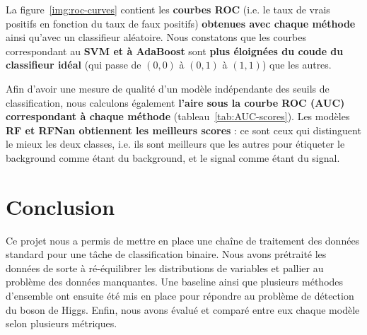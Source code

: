 \documentclass[12pt]{article}
\newcommand{\figref}[1]{figure~\ref{#1}}
\newcommand{\tabref}[1]{tableau~\ref{#1}}
\begin{document}
La \figref{img:roc-curves} contient les \textbf{courbes ROC} (i.e. le taux de
vrais positifs en fonction du taux de faux positifs) \textbf{obtenues avec
chaque méthode} ainsi qu'avec un classifieur aléatoire. Nous constatons que les
courbes correspondant au \textbf{SVM et à AdaBoost} sont \textbf{plus éloignées
du coude du classifieur idéal} (qui passe de $(0,0)$ à $(0,1)$ à $(1,1)$) que
les autres. 

Afin d'avoir une mesure de qualité d'un modèle indépendante des seuils de
classification, nous calculons également \textbf{l'aire sous la courbe ROC (AUC)
correspondant à chaque méthode} (\tabref{tab:AUC-scores}). Les modèles
\textbf{RF et RFNan obtiennent les meilleurs scores} : ce sont ceux qui
distinguent le mieux les deux classes, i.e. ils sont meilleurs que les autres
pour étiqueter le background comme étant du background, et le signal comme étant
du signal. \\

\begin{table}[H]
\centering
{}
\caption{AUC obtenus avec chaque méthode}
\label{tab:AUC-scores}
\end{table}

\section{Conclusion}

Ce projet nous a permis de mettre en place une chaîne de traitement des données
standard pour une tâche de classification binaire. Nous avons prétraité les
données de sorte à ré-équilibrer les distributions de variables et pallier au
problème des données manquantes. Une baseline ainsi que plusieurs méthodes
d'ensemble ont ensuite été mis en place pour répondre au problème de détection
du boson de Higgs. Enfin, nous avons évalué et comparé entre eux chaque modèle
selon plusieurs métriques.


\newpage
\printbibliography
\end{document}
